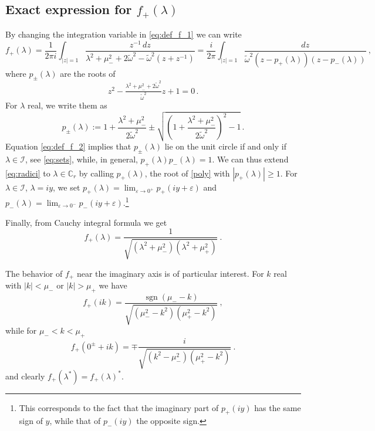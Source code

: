 \documentclass[11pt]{article}
\numberwithin{equation}{section}
\DeclareMathOperator{\sgn}{sgn}
\numberwithin{theorem}{section}
\newcommand{\matht}[1]{\texorpdfstring{#1}{}}
\newcommand{\e}{\varepsilon}
\def\tilde#1{\widetilde{#1}}
\begin{document}
\subsection{Exact expression for \matht{$f_+(\lambda)$}}\label{subsec:exact}

By changing the integration variable in \eqref{eq:def_f_1} we can write
%
\begin{equation}\label{eq:def_f_2}
f_+(\lambda)=  \frac{1}{2\pi i}\int_{|z|=1} \frac{z^{-1}
  \,dz}{\lambda^2+\mu_-^2+2 
  \tilde\omega^2- \tilde\omega^2(z+z^{-1})} =  \frac{i}{2\pi}\int_{|z|=1}
\frac{dz}{\tilde\omega^2(z-p_+(\lambda))(z-p_-(\lambda))}\ ,
\end{equation}
%
where $p_\pm(\lambda)$ are the roots of
\begin{equation}\label{poly}
z^2-\tfrac{\lambda^2+\mu_-^2+2 \tilde\omega^2}{ \tilde\omega^2}
z+1=0\, .
\end{equation}
For $\lambda$ real, we write them as
\begin{equation}\label{eq:radici}
p_\pm(\lambda) := 1+\frac{\lambda^2+\mu_-^2}{2\tilde
\omega^2}\pm\sqrt{\left(
  1+\frac{\lambda^2+\mu_-^2}{2\tilde \omega^2}\right)^2 -1}\, .
\end{equation}
Equation \eqref{eq:def_f_2} implies that $p_\pm(\lambda)$ lie on the unit circle if and only if $\lambda\in\mathcal I$,
see \eqref{eq:sets}, while, in general, $p_+(\lambda)p_-(\lambda)=1$. We can thus extend \eqref{eq:radici} to
$\lambda\in \mathds C_r$ by calling $p_+(\lambda)$, the root of \eqref{poly} with $|p_+(\lambda)|\geq1$. For $\lambda\in
\mathcal I$, $\lambda=iy$, we set $p_+(\lambda)=\lim_{\e\to 0^+} p_+(iy+\e)$ and $p_-(\lambda)=\lim_{\e\to 0^-}
p_-(iy+\e)$.\footnote{This corresponds to the fact that the imaginary part of $p_+(iy)$ has the same sign of $y$, while
	that of $p_-(iy)$ the opposite sign.} 
	
Finally, from Cauchy integral formula we get
\begin{equation}\label{eq:f_esplicita}
f_+(\lambda)= \frac{1}{\sqrt{(\lambda^2+\mu_-^2)(\lambda^2+\mu_+^2)}}\ .
\end{equation}

The behavior of $f_+$ near the imaginary axis is of particular interest. For $k$ real with $|k|< \mu_-$ or $|k|>
\mu_+$ we have
\begin{equation}\label{eq:nonb}
f_+(ik)=\frac{\sgn(\mu_--k)}
{\sqrt{(\mu_-^2-k^2)(\mu_+^2-k^2)}}\ ,
\end{equation}
while for $\mu_-<k<\mu_+$
\begin{equation}\label{eq:inb}
f_+(0^\pm+ik)=\mp\frac{i}{\sqrt{(k^2-\mu_-^2)(\mu_+^2-k^2)}}\ .
\end{equation}
and clearly $f_+(\lambda^*)=f_+(\lambda)^*$.
\end{document}
